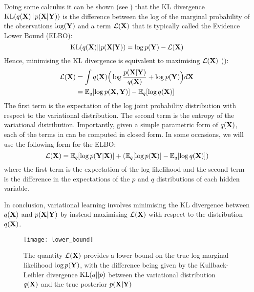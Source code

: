 Doing some calculus it can be shown (see \cite{Bishop2006,Murphy}) that the KL divergence ${\rm KL}(q({\bf X})||p({\bf X}|{\bf Y}))$ is the difference between the log of the marginal probability of the observations $\log({\bf Y})$ and a term $\mathcal{L}({\bf X})$ that is typically called the Evidence Lower Bound (ELBO):
\[
	{\rm KL}(q({\bf X})||p({\bf X}|{\bf Y})) = \log p({\bf Y}) - \mathcal{L}({\bf X})
\]
Hence, minimising the KL divergence is equivalent to maximising $\mathcal{L}({\bf X})$ ():
\begin{align} \label{eq_elbo1} \begin{split}
	\mathcal{L}({\bf X}) &= \int q({\bf X}) \Big( \log \frac{p({\bf X}|{\bf Y})}{q({\bf X})} + \log p({\bf Y}) \Big) d{\bf X} \\
	&= \mathbb{E}_q [\log p({\bf X},{\bf Y})] - \mathbb{E}_q [\log q({\bf X})]
\end{split} \end{align}
The first term is the expectation of the log joint probability distribution with respect to the variational distribution. The second term is the entropy of the variational distribution.
Importantly, given a simple parametric form of $q({\bf X})$, each of the terms in  can be computed in closed form. In some occasions, we will use the following form for the ELBO:
\begin{equation} \label{eq_elbo2}
	\mathcal{L}({\bf X}) = \mathbb{E}_q [\log p({\bf Y}|{\bf X})] + (\mathbb{E}_q [\log p({\bf X})] - \mathbb{E}_q [\log q({\bf X})])
\end{equation}
where the first term is the expectation of the log likelihood and the second term is the difference in the expectations of the $p$ and $q$ distributions of each hidden variable.

In conclusion, variational learning involves minimising the KL divergence between $q({\bf X})$ and $p({\bf X}|{\bf Y})$ by instead maximising $\mathcal{L}({\bf X})$ with respect to the distribution $q({\bf X})$.

\begin{figure}[H]
	\centering
	\texttt{[image: lower\_bound]}
	\caption{The quantity $\mathcal{L}({\bf X})$ provides a lower bound on the true log marginal likelihood $\log p({\bf Y})$, with the difference being given by the Kullback-Leibler divergence ${\rm KL}(q||p)$ between the variational distribution $q({\bf X})$ and the true posterior $p({\bf X}|{\bf Y})$}
	\label{fig:ELBO}
\end{figure}

